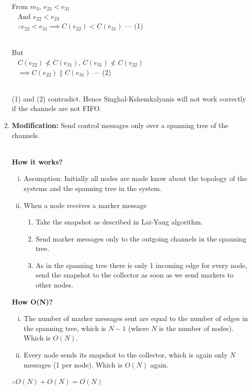 \documentclass{article}
\begin{document}
\begin{enumerate}
	From $m_3$, $e_{23} < e_{31}$ \\~
	And $e_{22} < e_{23}$ \\~
	$\therefore e_{22} < e_{31} \implies C(e_{22}) < C(e_{31}) $ --- (1) \\~
	
	But \\~
	$C(e_{22}) \nless C(e_{31})$, $C(e_{31}) \nless C(e_{22})$ \\~
	$\implies C(e_{22}) \parallel C(e_{31})$ --- (2) \\~
	
	(1) and (2) contradict. Hence Singhal-Kshemkalyanis will not work correctly if the channels are not FIFO.
	 
    \item %
	\textbf{Modification:} Send control messages only over a spanning tree of the channels.\\~
	
	\textbf{How it works?}
	
	\begin{enumerate}[i.]
		\item Assumption: Initially all nodes are made know about the topology of the systems and the spanning tree in the system.
		\item When a node receives a marker message
		\begin{enumerate}[label=\alph*.]
			\item Take the snapshot as described in Lai-Yang algorithm.
			\item Send marker messages only to the outgoing channels in the spanning tree.
			\item As in the spanning tree there is only 1 incoming edge for every node, send the snapshot to the collector as soon as we send markers to other nodes.
		\end{enumerate}
	\end{enumerate}
	
	\textbf{How O(N)?}
	
	\begin{enumerate}[i.]
	\item The number of marker messages sent are equal to the number of edges in the spanning tree, which is $N-1$ (where $N$ is the number of nodes). Which is $O(N)$.
	
	\item Every node sends its snapshot to the collector, which is again only $N$ messages (1 per node). Which is $O(N)$ again.	
	\end{enumerate}
	
	$\therefore O(N)+O(N) = O(N)$
	
	    
    
   \end{enumerate}
\end{document}
